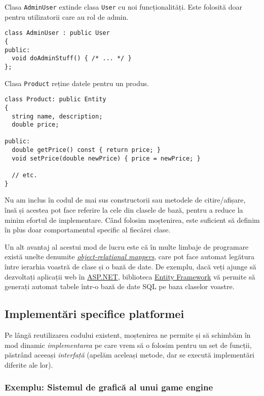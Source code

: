 Clasa \texttt{AdminUser} extinde clasa \texttt{User} cu noi funcționalități. Este folosită doar pentru utilizatorii care au rol de admin.
\begin{lstlisting}
class AdminUser : public User
{
public:
  void doAdminStuff() { /* ... */ }
};
\end{lstlisting}

Clasa \texttt{Product} reține datele pentru un produs.
\begin{lstlisting}
class Product: public Entity
{
  string name, description;
  double price;

public:
  double getPrice() const { return price; }
  void setPrice(double newPrice) { price = newPrice; }

  // etc.
}
\end{lstlisting}

Nu am inclus în codul de mai sus constructorii sau metodele de citire/afișare, însă și acestea pot face referire la cele din clasele de bază, pentru a reduce la minim efortul de implementare. Când folosim moștenirea, este suficient să definim în plus doar comportamentul specific al fiecărei clase.

Un alt avantaj al acestui mod de lucru este că în multe limbaje de programare există unelte denumite \href{https://en.wikipedia.org/wiki/Object\%E2\%80\%93relational_mapping}{\textit{object-relational mappers}}, care pot face automat legătura între ierarhia voastră de clase și o bază de date. De exemplu, dacă veți ajunge să dezvoltați aplicații web în \href{https://dotnet.microsoft.com/en-us/apps/aspnet}{ASP.NET}, biblioteca \href{https://learn.microsoft.com/en-us/ef/}{Entity Framework} vă permite să generați automat tabele într-o bază de date SQL pe baza claselor voastre.

\subsection*{Implementări specifice platformei}

Pe lângă reutilizarea codului existent, moștenirea ne permite și să schimbăm în mod dinamic \emph{implementarea} pe care vrem să o folosim pentru un set de funcții, păstrând aceeași \emph{interfață} (apelăm aceleași metode, dar se execută implementări diferite ale lor).

\subsubsection*{Exemplu: Sistemul de grafică al unui game engine}

